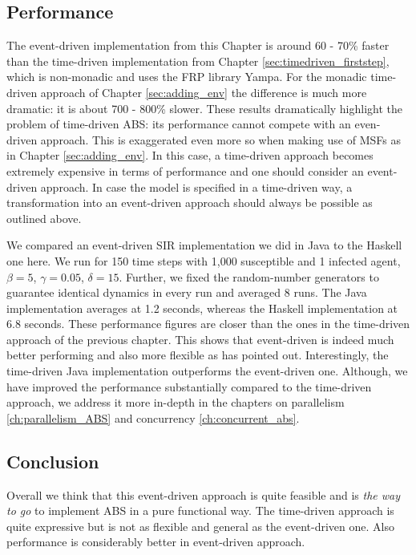 \subsection{Performance}
The event-driven implementation from this Chapter is around 60 - 70\% faster than the time-driven implementation from Chapter \ref{sec:timedriven_firststep}, which is non-monadic and uses the FRP library Yampa. For the monadic time-driven approach of Chapter \ref{sec:adding_env} the difference is much more dramatic: it is about 700 - 800\% slower. These results dramatically highlight the problem of time-driven ABS: its performance cannot compete with an even-driven approach. This is exaggerated even more so when making use of MSFs as in Chapter \ref{sec:adding_env}. In this case, a time-driven approach becomes extremely expensive in terms of performance and one should consider an event-driven approach. In case the model is specified in a time-driven way, a transformation into an event-driven approach should always be possible as outlined above.

We compared an event-driven SIR implementation we did in Java to the Haskell one here. We run for 150 time steps with 1,000 susceptible and 1 infected agent, $\beta = 5$, $\gamma = 0.05$, $\delta = 15$. Further, we fixed the random-number generators to guarantee identical dynamics in every run and averaged 8 runs. The Java implementation averages at 1.2 seconds, whereas the Haskell implementation at 6.8 seconds. These performance figures are closer than the ones in the time-driven approach of the previous chapter. This shows that event-driven is indeed much better performing and also more flexible as \cite{meyer_event-driven_2014} has pointed out. Interestingly, the time-driven Java implementation outperforms the event-driven one. Although, we have improved the performance substantially compared to the time-driven approach, we address it more in-depth in the chapters on parallelism \ref{ch:parallelism_ABS} and concurrency \ref{ch:concurrent_abs}.


\subsection{Conclusion}
Overall we think that this event-driven approach is quite feasible and is \textit{the way to go} to implement ABS in a pure functional way. The time-driven approach is quite expressive but is not as flexible and general as the event-driven one. Also performance is considerably better in event-driven approach.

